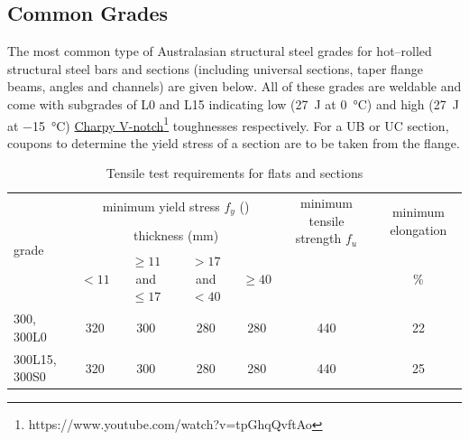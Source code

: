 \subsection{Common Grades}
The most common type of Australasian structural steel grades for hot--rolled structural steel bars and sections (including universal sections, taper flange beams, angles and channels) are given below. All of these grades are weldable and come with subgrades of L0 and L15 indicating low (\SI{27}{\joule} at \SI{0}{\celsius}) and high (\SI{27}{\joule} at \SI{-15}{\celsius}) \href{https://www.youtube.com/watch?v=tpGhqQvftAo}{Charpy V-notch}\footnote{https://www.youtube.com/watch?v=tpGhqQvftAo} toughnesses respectively. For a UB or UC section, coupons to determine the yield stress of a section are to be taken from the flange.
\begin{table}[H]
\centering\footnotesize\caption{Tensile test requirements for flats and sections}\label{tab:ys}
\begin{tabular}{l|cccc|c|c}
	\toprule
	\multirow{3}[0]{*}{\centering{}grade} &        \multicolumn{4}{c|}{minimum yield stress $f_y$ (\si{\mpa})}        & \multicolumn{1}{c|}{\multirow{2}[0]{*}{\parbox{2.5cm}{\centering{}minimum tensile strength $f_u$}}} & \multicolumn{1}{c}{\multirow{2}[0]{*}{\parbox{2cm}{\centering{}minimum elongation}}} \\
	                                      &                 \multicolumn{4}{c|}{thickness (\si{\mm})}                 &                                                                                                     &                                                                                      \\
	                                      & $<11$ & $\geqslant11$ and $\leqslant17$ & $>17$ and $<40$ & $\geqslant40$ &                                              \si{\mpa}                                              &                                    \si{\percent}                                     \\ \midrule
	300, 300L0                            &  320  &               300               &       280       &      280      &                                                 440                                                 &                                          22                                          \\
	300L15, 300S0                         &  320  &               300               &       280       &      280      &                                                 440                                                 &                                          25                                          \\

\end{tabular}
\end{table}
